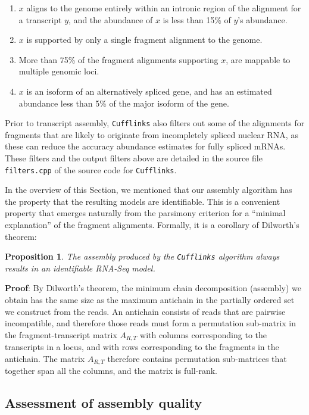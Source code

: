 \documentclass[12pt]{amsart}
\newtheorem{prop}[thm]{Proposition}
\theoremstyle{definition}
\begin{document}
\begin{enumerate}
    \item $x$ aligns to the genome entirely within an intronic region of the alignment for a transcript $y$, and the abundance of $x$ is less than 15\% of $y$'s abundance.
    \item $x$ is supported by only a single fragment alignment to the genome.
    \item More than 75\% of the fragment alignments supporting $x$, are mappable to multiple genomic loci.
    \item $x$ is an isoform of an alternatively spliced gene, and has an estimated abundance less than 5\% of the major isoform of the gene. 
\end{enumerate}

Prior to transcript assembly, {\tt Cufflinks} also filters out some of the alignments
for fragments that are likely to originate from incompletely spliced nuclear
RNA, as these can reduce the accuracy abundance estimates for fully spliced
mRNAs. These filters and the output filters above are detailed in the source
file \verb!filters.cpp! of the source code for {\tt Cufflinks}.

In the overview of this Section, we mentioned that our assembly algorithm has the property that the resulting models are identifiable. This is a convenient property that emerges naturally from the parsimony criterion for a ``minimal explanation'' of the fragment alignments. Formally, it is a corollary of Dilworth's theorem:

\begin{prop}
The assembly produced by the {\tt Cufflinks} algorithm always results in an
identifiable RNA-Seq model.
\end{prop}
{\bf Proof}:  By Dilworth's theorem, the minimum chain decomposition (assembly)
we obtain has the same size as the maximum antichain in the partially
ordered set  we
construct from the reads. An antichain consists of reads that are
pairwise incompatible, and therefore those reads must form a
permutation sub-matrix in the fragment-transcript matrix $A_{R,T}$ with columns corresponding to the transcripts in a locus, and with rows corresponding to the fragments in the antichain. The matrix $A_{R,T}$ therefore contains permutation sub-matrices that together span all the columns, and the matrix is full-rank.

\subsection{Assessment of assembly quality}
\end{document}
